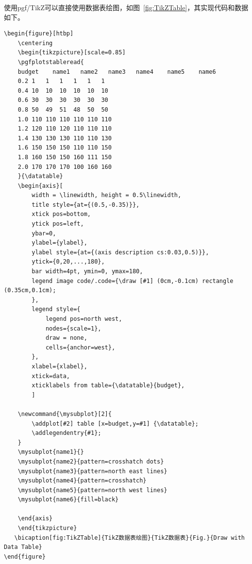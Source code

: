 使用pgf/TikZ可以直接使用数据表绘图，如图~\ref{fig:TikZTable}，其实现代码和数据如下。

{\wuhao
\begin{lstlisting}
\begin{figure}[htbp]
    \centering
	\begin{tikzpicture}[scale=0.85]
	\pgfplotstableread{
	budget    name1   name2   name3   name4    name5    name6
	0.2 1   1   1   1   1   1
	0.4 10  10  10  10  10  10
	0.6 30  30  30  30  30  30
	0.8 50  49  51  48  50  50
	1.0 110 110 110 110 110 110
	1.2 120 110 120 110 110 110
	1.4 130 130 130 110 110 130
	1.6 150 150 150 110 110 150
	1.8 160 150 150 160 111 150
	2.0 170 170 170 100 160 160
	}{\datatable}
	\begin{axis}[
	    width = \linewidth, height = 0.5\linewidth,
	    title style={at={(0.5,-0.35)}},
	    xtick pos=bottom,
	    ytick pos=left,
	    ybar=0,
	    ylabel={ylabel},
	    ylabel style={at={(axis description cs:0.03,0.5)}},
	    ytick={0,20,...,180},
	    bar width=4pt, ymin=0, ymax=180,
	    legend image code/.code={\draw [#1] (0cm,-0.1cm) rectangle (0.35cm,0.1cm);
	    },
	    legend style={
	        legend pos=north west,
	        nodes={scale=1},
	        draw = none,
	        cells={anchor=west},
	    },
	    xlabel={xlabel},
	    xtick=data,
	    xticklabels from table={\datatable}{budget},
	    ]

	\newcommand{\mysubplot}[2]{
	    \addplot[#2] table [x=budget,y=#1] {\datatable};
	    \addlegendentry{#1};
	}
	\mysubplot{name1}{}
	\mysubplot{name2}{pattern=crosshatch dots}
	\mysubplot{name3}{pattern=north east lines}
	\mysubplot{name4}{pattern=crosshatch}
	\mysubplot{name5}{pattern=north west lines}
	\mysubplot{name6}{fill=black}

	\end{axis}
	\end{tikzpicture}
   \bicaption[fig:TikZTable]{TikZ数据表绘图}{TikZ数据表}{Fig.}{Draw with Data Table}
\end{figure}
\end{lstlisting}
}

